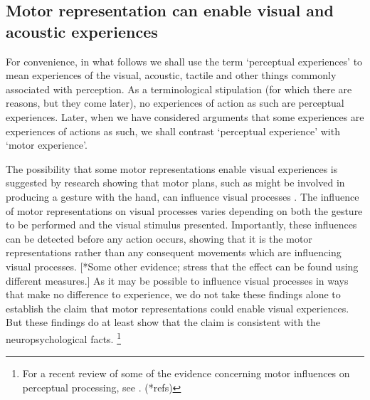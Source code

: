 \documentclass[12pt,\papersize]{extarticle}
\begin{document}
\subsection{Motor representation can enable visual and acoustic experiences}
For convenience, in what follows we shall use the term `perceptual experiences' to mean experiences of the visual, acoustic, tactile and other things commonly associated with perception.  As a terminological stipulation (for which there are reasons, but they come later), no experiences of action as such are perceptual experiences.  Later, when we have considered arguments that some experiences are experiences of actions as such, we shall contrast `perceptual experience' with `motor experience'.

The possibility that some motor representations enable visual experiences is suggested by research showing that motor plans, such as might be involved in producing a gesture with the hand, can influence visual processes \citep{bortoletto:2011_action}. The influence of motor representations on visual processes varies depending on both the gesture to be performed and the visual stimulus presented. Importantly, these influences can be detected before any action occurs, showing that it is the motor representations rather than any consequent movements which are influencing visual processes. [*Some other evidence; stress that the effect can be found using different measures.]  As it may be possible to influence visual processes in ways that make no difference to experience, we do not take these findings alone to establish the claim that motor representations could enable visual experiences.  But these findings do at least show that the claim is consistent with the neuropsychological facts.%
\footnote{
For a recent review of some of the evidence concerning motor influences on perceptual processing, see \citet{halasz:2012_unconscious}. (*refs)
}  
\end{document}
